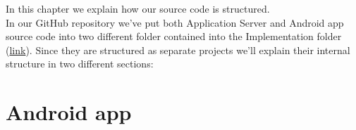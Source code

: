 In this chapter we explain how our source code is structured. \\
In our GitHub repository we've put both Application Server and Android app source code into two different folder contained into the Implementation folder (\href{https://github.com/JustSalva/MelziPinaSalvadore/tree/master/Implementation}{\color{blue}link}). 
Since they are structured as separate projects we'll explain their internal structure in two different sections:
\section{Android app}
\begin{figure}
\end{figure}

